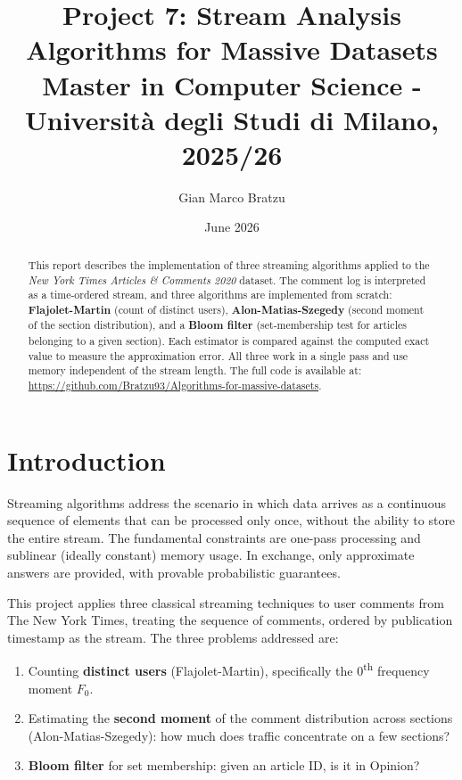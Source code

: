 \documentclass[11pt,a4paper]{article}
\title{\textbf{Project 7: Stream Analysis}\\[4pt]
       \large Algorithms for Massive Datasets\\
       Master in Computer Science - Università degli Studi di Milano, 2025/26}
\author{Gian Marco Bratzu}
\date{June 2026}
\begin{document}
\maketitle

\begin{abstract}
This report describes the implementation of three streaming algorithms applied to the
\textit{New York Times Articles \& Comments 2020} dataset.
The comment log is interpreted as a time-ordered stream, and three algorithms are
implemented from scratch: \textbf{Flajolet-Martin} (count of distinct users),
\textbf{Alon-Matias-Szegedy} (second moment of the section distribution), and a
\textbf{Bloom filter} (set-membership test for articles belonging to a given section).
Each estimator is compared against the computed exact value to measure the
approximation error. All three work in a single pass and use memory independent of
the stream length.
The full code is available at:
\url{https://github.com/Bratzu93/Algorithms-for-massive-datasets}.
\end{abstract}

\section{Introduction}

Streaming algorithms address the scenario in which data arrives as a continuous sequence
of elements that can be processed only once, without the ability to store the entire stream.
The fundamental constraints are one-pass processing and sublinear (ideally constant)
memory usage. In exchange, only approximate answers are provided, with provable
probabilistic guarantees.

This project applies three classical streaming techniques to user comments from
The New York Times, treating the sequence of comments, ordered by publication
timestamp as the stream.
The three problems addressed are:
\begin{enumerate}
  \item Counting \textbf{distinct users} (Flajolet-Martin), specifically the
        0\textsuperscript{th} frequency moment $F_0$.
  \item Estimating the \textbf{second moment} of the comment distribution across
        sections (Alon-Matias-Szegedy): how much does traffic concentrate on a few sections?
  \item \textbf{Bloom filter} for set membership: given an article ID, is it in Opinion?
\end{enumerate}
\end{document}
